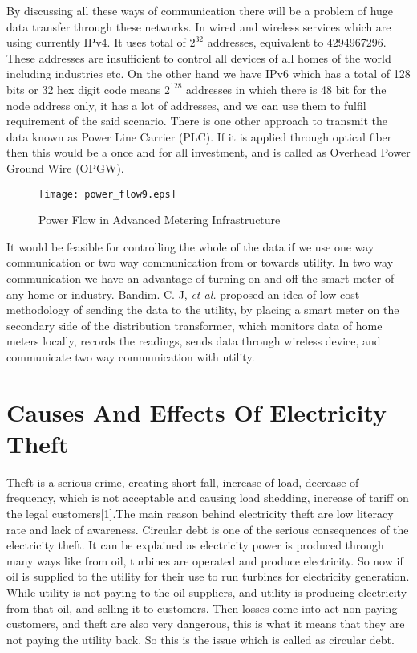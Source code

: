 \documentclass[10pt, conference, compsocconf]{IEEEtran}
\begin{document}
By discussing all these ways of communication there will be a problem of huge data transfer through these networks. In wired and wireless services which are using currently IPv4. It uses total of $2^{32}$ addresses, equivalent to 4294967296. These addresses are insufficient to control all devices of all homes of the world including industries etc. On the other hand we have IPv6 which has a total of 128 bits or 32 hex digit code means $2^{128}$ addresses in which there is 48 bit for the node address only, it has a lot of addresses, and we can use them to fulfil requirement of the said scenario. There is one other approach to transmit the data known as Power Line Carrier (PLC). If it is applied through optical fiber then this would be a once and for all investment, and is called as Overhead Power Ground Wire (OPGW).

\begin{figure*}[t]
\centering
\texttt{[image: power\_flow9.eps]}
\caption{Power Flow in Advanced Metering Infrastructure}
\end{figure*}

It would be feasible for controlling the whole of the data if we use one way communication or two way communication from or towards utility. In two way communication we have an advantage of turning on and off the smart meter of any home or industry. Bandim. C. J, \textit{et al.} proposed an idea of low cost methodology of sending the data to the utility, by placing a smart meter on the secondary side of the distribution transformer, which monitors data of home meters locally, records the readings, sends data through wireless device, and communicate two way communication with utility.

\section{Causes And Effects Of Electricity Theft}

Theft is a serious crime, creating short fall, increase of load, decrease of frequency, which is not acceptable and causing load shedding, increase of tariff on the legal customers[1].The main reason behind electricity theft are low literacy rate and lack of awareness. Circular debt is one of the serious consequences of the electricity theft. It can be explained as electricity power is produced through many ways like from oil, turbines are operated and produce electricity. So now if oil is supplied to the utility for their use to run turbines for electricity generation. While utility is not paying to the oil suppliers, and utility is producing electricity from that oil, and selling it to customers. Then losses come into act non paying customers, and theft are also very dangerous, this is what it means that they are not paying the utility back. So this is the issue which is called as circular debt.
\end{document}
